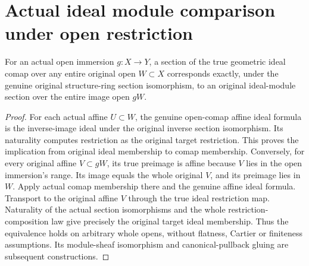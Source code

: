 \section{Actual ideal module comparison under open restriction}
\begin{lemma}
\label{lem:actual-ideal-open-section-membership}
\leanok
{}
For an actual open immersion $g:X\to Y$, a section of the true geometric
ideal comap over any entire original open $W\subset X$ corresponds
exactly, under the genuine original structure-ring section isomorphism,
to an original ideal-module section over the entire image open $gW$.
\end{lemma}
\begin{proof}
For each actual affine $U\subset W$, the genuine open-comap affine ideal
formula is the inverse-image ideal under the original inverse section
isomorphism. Its naturality computes restriction as the original target
restriction. This proves the implication from original ideal membership
to comap membership. Conversely, for every original affine $V\subset gW$,
its true preimage is affine because $V$ lies in the open immersion's
range. Its image equals the whole original $V$, and its preimage lies
in $W$. Apply actual comap membership there and the genuine affine ideal
formula. Transport to the original affine $V$ through the true ideal
restriction map. Naturality of the actual section isomorphisms and the
whole restriction-composition law give precisely the original target
ideal membership. Thus the equivalence holds on arbitrary whole opens,
without flatness, Cartier or finiteness assumptions. Its module-sheaf
isomorphism and canonical-pullback gluing are subsequent constructions.
\end{proof}

